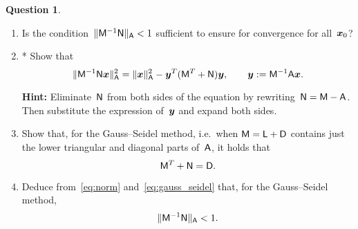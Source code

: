 \documentclass[11pt]{article}
\theoremstyle{definition}
\newtheorem{question}{Question}
\theoremstyle{remark}
\theoremstyle{plain}%
\begin{document}
\begin{question}
\begin{enumerate}
        \item
            \mymark
            Is the condition~$\lVert\mathsf M^{-1} \mathsf N\rVert_{\mathsf A} < 1$ sufficient to ensure for convergence for all~$\mathbf{\boldsymbol{x}}_0$?

        \item
            *
            Show that
            \begin{equation}
                \label{eq:norm}
                \lVert\mathsf M^{-1} \mathsf N \mathbf{\boldsymbol{x}}\rVert_{\mathsf A}^2
                = \lVert\mathbf{\boldsymbol{x}}\rVert_{\mathsf A}^2 - \mathbf{\boldsymbol{y}}^T (\mathsf M^T + \mathsf N) \mathbf{\boldsymbol{y}},
                \qquad \mathbf{\boldsymbol{y}} :=  \mathsf M^{-1} \mathsf A \mathbf{\boldsymbol{x}}.
            \end{equation}

            \textbf{Hint: } Eliminate~$\mathsf N$ from both sides of the equation by rewriting~$\mathsf N = \mathsf M - \mathsf A$.
            Then substitute the expression of~$\mathbf{\boldsymbol{y}}$ and expand both sides.


        \item
            \mymark
            Show that, for the Gauss--Seidel method,
            i.e.\ when $\mathsf M = \mathsf L + \mathsf D$ contains just the lower triangular and diagonal parts of~$\mathsf A$,
            it holds that
            \begin{equation}
                \label{eq:gauss_seidel}
                \mathsf M^T + \mathsf N = \mathsf D.
            \end{equation}

        \item
            Deduce from~\eqref{eq:norm} and~\eqref{eq:gauss_seidel} that,
            for the Gauss--Seidel method,
            \[
                \lVert\mathsf M^{-1} \mathsf N\rVert_{\mathsf A} < 1.
            \]
    \end{enumerate}
\end{question}
\end{document}
